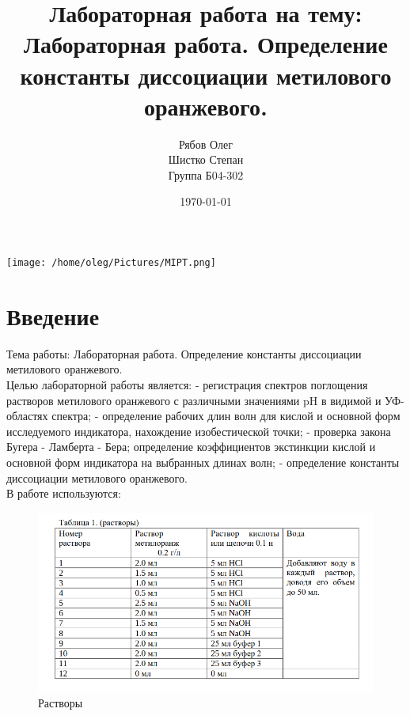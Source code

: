 \documentclass[a4paper, 12pt]{article}
\begin{document}
\begin{titlepage}
    \title{Лабораторная работа на тему: \\        
    Лабораторная работа. Определение константы диссоциации метилового оранжевого.
    }
    \author{Рябов Олег \\
    Шистко Степан\\
    Группа Б04-302}
    \date{\today}
    \maketitle
    \vfill
    \begin{center}
        \texttt{[image: /home/oleg/Pictures/MIPT.png]}
    \end{center}
\end{titlepage}

\setcounter{page}{2}
\tableofcontents
\newpage
\section{Введение}
Тема работы: Лабораторная работа. Определение константы диссоциации метилового оранжевого.
\\
Целью лабораторной работы является:
- регистрация спектров поглощения растворов метилового оранжевого с различными
значениями pH в видимой и УФ-областях спектра;
- определение рабочих длин волн для кислой и основной форм исследуемого
индикатора, нахождение изобестической точки;
- проверка закона Бугера - Ламберта - Бера; определение коэффициентов экстинкции
кислой и основной форм индикатора на выбранных длинах волн;
- определение константы диссоциации метилового оранжевого.
\\

В работе используются:
\begin{figure}[h!]
    \centering
    \includegraphics[width=120mm]{./uses.png}
    \caption{Растворы}
\end{figure}
\end{document}
